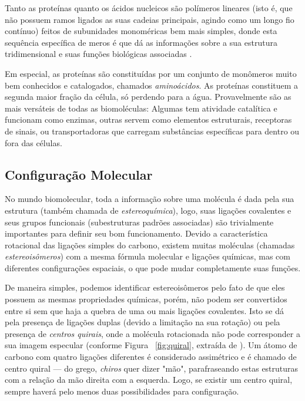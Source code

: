\documentclass[a4paper,12pt]{article}
\begin{document}
	Tanto as proteínas quanto os ácidos nucleicos são polímeros lineares (isto é, que não possuem ramos ligados as suas cadeias principais, agindo como um longo fio contínuo) feitos de subunidades monoméricas bem mais simples, donde esta sequência específica de meros é que dá as informações sobre a sua estrutura tridimensional e suas funções biológicas associadas \cite{bioquimicaLehninger}.
	
	Em especial, as proteínas são constituídas por um conjunto de monômeros muito bem conhecidos e catalogados, chamados \textit{aminoácidos}. As proteínas constituem a segunda maior fração da célula, só perdendo para a água. Provavelmente são as mais versáteis de todas as biomoléculas: Algumas tem atividade catalítica e funcionam como enzimas, outras servem como elementos estruturais, receptoras de sinais, ou transportadoras que carregam substâncias específicas para dentro ou fora das células.  
	
	\subsection{Configuração Molecular}
	No mundo biomolecular, toda a informação sobre uma molécula é dada pela sua estrutura (também chamada de \textit{estereoquímica}), logo, suas ligações covalentes e seus grupos funcionais (subestruturas padrões associadas) são trivialmente importantes para definir seu bom funcionamento. Devido a característica rotacional das ligações simples do carbono, existem muitas moléculas (chamadas \textit{estereoisômeros}) com a mesma fórmula molecular e ligações químicas, mas com diferentes configurações espaciais, o que pode mudar completamente suas funções. 
	
	De maneira simples, podemos identificar estereoisômeros pelo fato de que eles possuem as mesmas propriedades químicas, porém, não podem ser convertidos entre si sem que haja a quebra de uma ou mais ligações covalentes. Isto se dá pela presença de ligações duplas (devido a limitação na sua rotação) ou pela presença de \textit{centros quirais}, onde a molécula rotacionada não pode corresponder a sua imagem especular (conforme Figura ~\ref{fig:quiral}, extraída de \cite{bioquimicaLehninger}). Um átomo de carbono com quatro ligações diferentes é considerado assimétrico e é chamado de centro quiral --- do grego, \textit{chiros} quer dizer "mão", parafraseando estas estruturas com a relação da mão direita com a esquerda. Logo, se existir um centro quiral, sempre haverá pelo menos duas possibilidades para configuração.
	 
\end{document}
